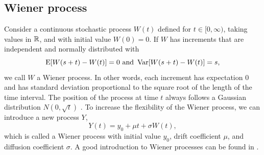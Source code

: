 \subsection{Wiener process}\label{subsec:wiener}
Consider a continuous stochastic process $W(t)$ defined for $t\in[0,\infty)$, taking values in $\mathbb{R}$, and with initial value $W(0)=0$. If $W$ has increments that are independent and normally distributed with
\begin{equation*}
    \operatorname{E}[W(s+t)-W(t)]=0\text{   and   }\operatorname{Var}[W(s+t)-W(t)]=s,
\end{equation*}
we call $W$ a Wiener process.
In other words, each increment has expectation 0 and has standard deviation proportional to the square root of the length of the time interval.
The position of the process at time $t$ always follows a Gaussian distribution $N(0, \sqrt{t})$ \citep{ABG}.
To increase the flexibility of the Wiener process, we can introduce a new process $Y$,
\begin{equation}\label{wiener}
    Y(t)=y_0+\mu t+\sigma W(t),
\end{equation}
which is called a Wiener process with initial value $y_0$, drift coefficient $\mu$, and diffusion coefficient $\sigma$.
A good introduction to Wiener processes can be found in \citet{cox1965}.

